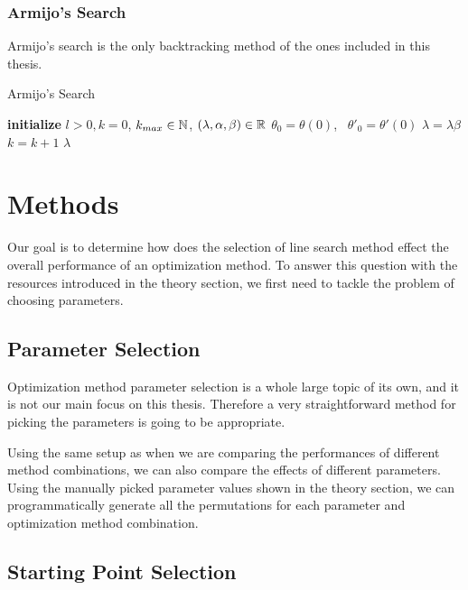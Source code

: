 \documentclass[a4paper,english,titlepage,12pt]{article}
\newcommand{\R}{\ensuremath\mathbb{R}}
\newcommand{\N}{\ensuremath\mathbb{N}}
\begin{document}
\subsubsection{Armijo's Search}

Armijo's search is the only backtracking method of the ones included in this thesis. 

\begin{algorithm}[H]
\caption{Armijo's Search}
\label{alg_armijo}
\begin{algorithmic}[1]
\STATE \textbf{initialize} $l > 0, k = 0$, $k_{max} \in \N$, $(\lambda, \alpha, \beta) \in \R$
\STATE $\theta_0 = \theta(0)$, \ $\theta'_0 = \theta'(0)$
    \STATE $\lambda = \lambda \beta$
    \STATE $k = k + 1$
\ENDWHILE
\RETURN $\lambda$
\end{algorithmic}
\end{algorithm}


\section{Methods}


Our goal is to determine how does the selection of line search method effect the overall performance of an optimization method. To answer this question with the resources introduced in the theory section, we first need to tackle the problem of choosing parameters.


\subsection{Parameter Selection}

Optimization method parameter selection is a whole large topic of its own, and it is not our main focus on this thesis. Therefore a very straightforward method for picking the parameters is going to be appropriate.

Using the same setup as when we are comparing the performances of different method combinations, we can also compare the effects of different parameters. Using the manually picked parameter values shown in the theory section, we can programmatically generate all the permutations for each parameter and optimization method combination.

\subsection{Starting Point Selection}
\end{document}

